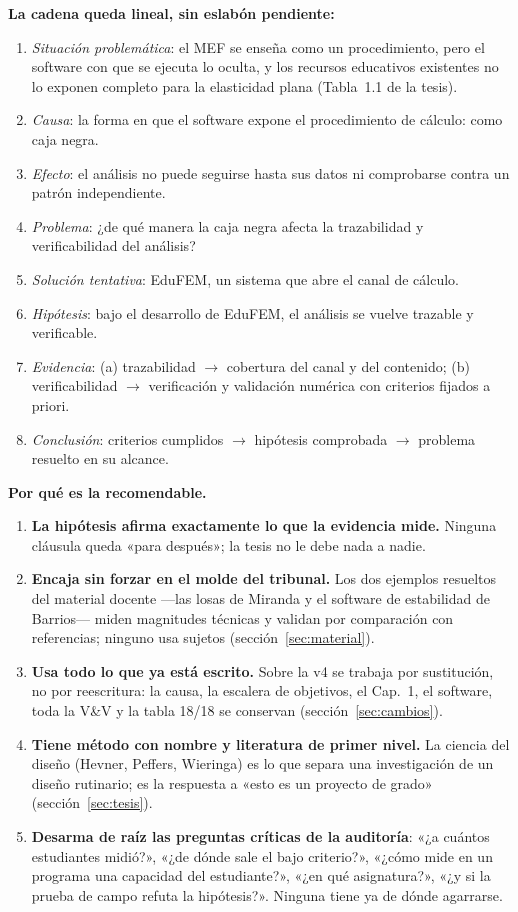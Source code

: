 \documentclass[11pt,a4paper]{article}
\begin{document}
\textbf{La cadena queda lineal, sin eslabón pendiente:}
\begin{enumerate}
\item \emph{Situación problemática}: el MEF se enseña como un procedimiento, pero el software con que se ejecuta lo oculta, y los recursos educativos existentes no lo exponen completo para la elasticidad plana (Tabla~1.1 de la tesis).
\item \emph{Causa}: la forma en que el software expone el procedimiento de cálculo: como caja negra.
\item \emph{Efecto}: el análisis no puede seguirse hasta sus datos ni comprobarse contra un patrón independiente.
\item \emph{Problema}: ¿de qué manera la caja negra afecta la trazabilidad y verificabilidad del análisis?
\item \emph{Solución tentativa}: EduFEM, un sistema que abre el canal de cálculo.
\item \emph{Hipótesis}: bajo el desarrollo de EduFEM, el análisis se vuelve trazable y verificable.
\item \emph{Evidencia}: (a) trazabilidad $\to$ cobertura del canal y del contenido; (b) verificabilidad $\to$ verificación y validación numérica con criterios fijados a priori.
\item \emph{Conclusión}: criterios cumplidos $\to$ hipótesis comprobada $\to$ problema resuelto en su alcance.
\end{enumerate}

\textbf{Por qué es la recomendable.}
\begin{enumerate}
\item \textbf{La hipótesis afirma exactamente lo que la evidencia mide.} Ninguna cláusula queda «para después»; la tesis no le debe nada a nadie.
\item \textbf{Encaja sin forzar en el molde del tribunal.} Los dos ejemplos resueltos del material docente —las losas de Miranda y el software de estabilidad de Barrios— miden magnitudes técnicas y validan por comparación con referencias; ninguno usa sujetos (sección~\ref{sec:material}).
\item \textbf{Usa todo lo que ya está escrito.} Sobre la v4 se trabaja por sustitución, no por reescritura: la causa, la escalera de objetivos, el Cap.~1, el software, toda la V\&V y la tabla 18/18 se conservan (sección~\ref{sec:cambios}).
\item \textbf{Tiene método con nombre y literatura de primer nivel.} La ciencia del diseño (Hevner, Peffers, Wieringa) es lo que separa una investigación de un diseño rutinario; es la respuesta a «esto es un proyecto de grado» (sección~\ref{sec:tesis}).
\item \textbf{Desarma de raíz las preguntas críticas de la auditoría}: «¿a cuántos estudiantes midió?», «¿de dónde sale el bajo criterio?», «¿cómo mide en un programa una capacidad del estudiante?», «¿en qué asignatura?», «¿y si la prueba de campo refuta la hipótesis?». Ninguna tiene ya de dónde agarrarse.
\end{enumerate}
\end{document}
